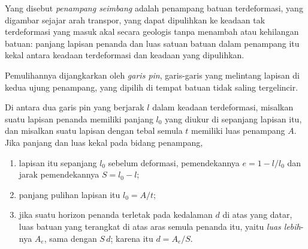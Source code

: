 \begin{definition}\label{def:b2:alpine-orogen:balanced}
Yang disebut \emph{penampang seimbang} adalah penampang batuan
terdeformasi, yang digambar sejajar arah transpor, yang dapat dipulihkan ke keadaan tak terdeformasi
yang masuk akal secara geologis tanpa menambah atau kehilangan batuan: panjang lapisan penanda dan
luas satuan batuan dalam penampang itu kekal antara keadaan terdeformasi dan keadaan
yang dipulihkan.
\end{definition}

Pemulihannya dijangkarkan oleh \emph{garis pin}, garis-garis yang melintang lapisan di kedua ujung
penampang, yang dipilih di tempat batuan tidak saling tergelincir.

\begin{proposition}\label{prop:b2:alpine-orogen:balance}
Di antara dua garis pin yang berjarak $l$ dalam keadaan terdeformasi, misalkan suatu lapisan penanda memiliki
panjang $l_0$ yang diukur di sepanjang lapisan itu, dan misalkan suatu lapisan dengan tebal semula $t$ memiliki
luas penampang $A$. Jika panjang dan luas kekal pada bidang penampang,
\begin{enumerate}
\item lapisan itu sepanjang $l_0$ sebelum deformasi, pemendekannya
$e = 1 - l/l_0$ dan jarak pemendekannya $S = l_0 - l$;
\item panjang pulihan lapisan itu $l_0 = A/t$;
\item jika suatu horizon penanda terletak pada kedalaman $d$ di atas  yang datar, luas batuan
yang terangkat di atas aras semula penanda itu, yaitu \emph{luas lebih}-nya $A_e$, sama dengan $S\,d$;
karena itu $d = A_e/S$.
\end{enumerate}
\end{proposition}

